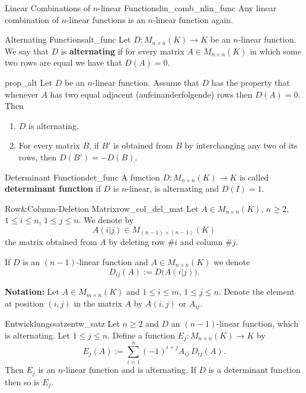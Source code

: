 \begin{lemma}{Linear Combinations of $n$-linear Functions}{lin_comb_nlin_func}
	Any linear combination of $n$-linear functions is an $n$-linear function again.
\end{lemma}

\begin{definition}{Alternating Functions}{alt_func}
	Let $D:M_{n\times n}(K) \to K$ be an $n$-linear function. We say that $D$ is \textbf{alternating} if for every matrix $A \in M_{n\times n}(K)$ in which some two rows are equal we have that $D(A) = 0$.
\end{definition}

\begin{proposition}{}{prop_alt}
	Let $D$ be an $n$-linear function. Assume that $D$ has the property that whenever $A$ has two equal adjacent (aufeinanderfolgende) rows then $D(A) = 0$. Then
	\begin{enumerate}
		\item $D$ is alternating.
		\item For every matrix $B$, if $B'$ is obtained from $B$ by interchanging any two of its rows, then $D(B') = -D(B)$.
	\end{enumerate}
\end{proposition}

\begin{definition}{Determinant Function}{det_func}
	A function $D:M_{n\times n}(K) \to K$ is called \textbf{determinant function} if $D$ is $n$-linear, is alternating and $D(I) = 1$.
\end{definition}

\begin{definition}{Row\&Column-Deletion Matrix}{row_col_del_mat}
	Let $A \in M_{n\times n}(K)$, $n \geq 2$, $1 \leq i \leq n$, $1 \leq j \leq n$. We denote by 
	\[
		A(i|j) \in M_{(n-1)\times (n-1)}(K)
	\]
	the matrix obtained from $A$ by deleting row \#$i$ and column \#$j$.
	
	If $D$ is an $(n-1)$-linear function and $A \in M_{n\times n}(K)$ we denote
	\[
		D_{ij}(A) := D\big(A(i|j)\big).
	\]
\end{definition}

\textbf{Notation:} Let $A \in M_{m\times n}(K)$ and $1 \leq i \leq m$, $1 \leq j \leq n$. Denote the element at position $(i,j)$ in the matrix $A$ by $A(i,j)$ or $A_{ij}$.

\begin{theorem}{Entwicklungssatz}{entw_satz}
	Let $n \geq 2$ and $D$ an $(n-1)$-linear function, which is alternating. Let $1 \leq j \leq n$. Define a function $E_j:M_{n\times n}(K) \to K$ by
	\[
		E_j(A) := \sum_{i=1}^{n} (-1)^{i+j} A_{ij} \, D_{ij}(A).
	\]
	Then $E_j$ is an $n$-linear function and is alternating. If $D$ is a determinant function then so is $E_j$.
\end{theorem}

